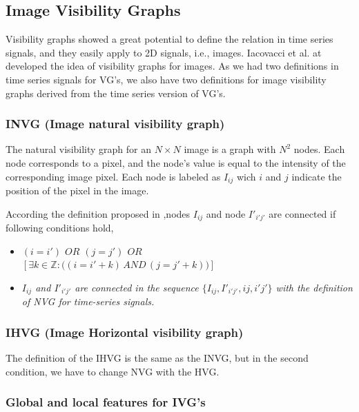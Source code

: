 \documentclass[conference]{IEEEtran}
\newcommand\tab[1][1cm]{\hspace*{#1}}
\begin{document}
\subsection{\textbf{Image Visibility Graphs}}
Visibility graphs showed a great potential to define the relation in time series signals, and they easily apply to 2D signals, i.e., images. Iacovacci et al. at \cite{IVG} developed the idea of visibility graphs for images. As we had two definitions in time series signals for VG's, we also have two definitions for image visibility graphs derived from the time series version of VG's.

\subsubsection{\textbf{INVG} (Image natural visibility graph)}
The natural visibility graph for an $N\times N$ image is a graph with $N^2$ nodes. Each node corresponds to a pixel, and the node's value is equal to the intensity of the corresponding image pixel. Each node is labeled as $I_{ij}$ wich $i$ and $j$ indicate the position of the pixel in the image.

According the definition proposed in \cite{IVG},nodes $I_{ij}$  and node $I'_{i'j'}$ are connected if following conditions hold,

\vspace{0.5cm}
\begin{itemize}
\setlength{\itemindent}{.5cm}
\item \emph{$(i=i')$ $OR$ $(j=j')$ $OR$  \\
\tab  $ [\exists k \in \mathbb{Z} : \big((i=i'+k)\, AND \, (j=j'+k)\big)]$} 
\vspace{0.1cm}
\item \emph{$I_{ij}$ and $I'_{i'j'}$ are connected in the sequence \tab $\big\{I_{ij},I'_{i'j'},ij, i'j'\big\}$ 
 with the definition of NVG for \tab time-series signals.}
\end{itemize}
\vspace{0.5cm}




\subsubsection{\textbf{IHVG} (Image Horizontal visibility graph)}
The definition of the IHVG is the same as the INVG, but in the second condition, we have to change NVG with the HVG.
\subsubsection{\textbf{Global and local features for IVG's}}
\end{document}
